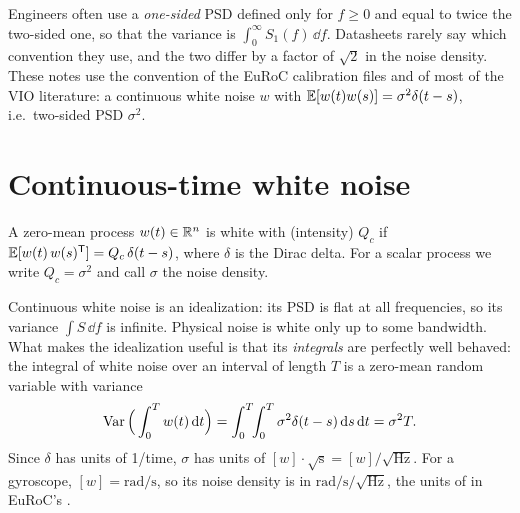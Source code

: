 \begin{pitfall}
Engineers often use a \emph{one-sided} PSD defined only for $f \ge 0$ and equal to twice the two-sided one, so that the variance is
$\int_0^\infty S_1(f)\,\dd f$. Datasheets rarely say which convention they use, and the two differ by a factor of $\sqrt2$ in the noise density.
These notes use the convention of the EuRoC calibration files and of most of the VIO literature: a continuous white noise $w$ with
$\mathbb{E}[w(t)w(s)] = \sigma^2\delta(t - s)$, i.e.\ two-sided PSD $\sigma^2$.
\end{pitfall}

\section{Continuous-time white noise}
\label{sec:ct-noise}

\begin{definition}
A zero-mean process $w(t) \in \mathbb{R}^n$ is white with  (intensity) $Q_c$ if
$\mathbb{E}[w(t)\,w(s)^{\mathsf{T}}] = Q_c\,\delta(t - s)$, where $\delta$ is the Dirac delta. For a scalar process we write $Q_c = \sigma^2$ and call $\sigma$ the noise
density.
\end{definition}

Continuous white noise is an idealization: its PSD is flat at all frequencies, so its variance $\int S\,\dd f$ is infinite. Physical noise is
white only up to some bandwidth. What makes the idealization useful is that its \emph{integrals} are perfectly well behaved: the integral of
white noise over an interval of length $T$ is a zero-mean random variable with variance
\begin{equation}
  \operatorname{Var}\Big(\int_0^Tw(t)\,\mathrm{d} t\Big) = \int_0^T\!\!\int_0^T\sigma^2\delta(t - s)\,\mathrm{d} s\,\mathrm{d} t = \sigma^2T .
\end{equation}
Since $\delta$ has units of 1/time, $\sigma$ has units of $[w]\cdot\sqrt{\mathrm s} = [w]/\sqrt{\mathrm{Hz}}$. For a gyroscope, $[w] = \mathrm{rad/s}$, so its
noise density is in $\mathrm{rad/s/\sqrt{Hz}}$, the units of  in EuRoC's .

